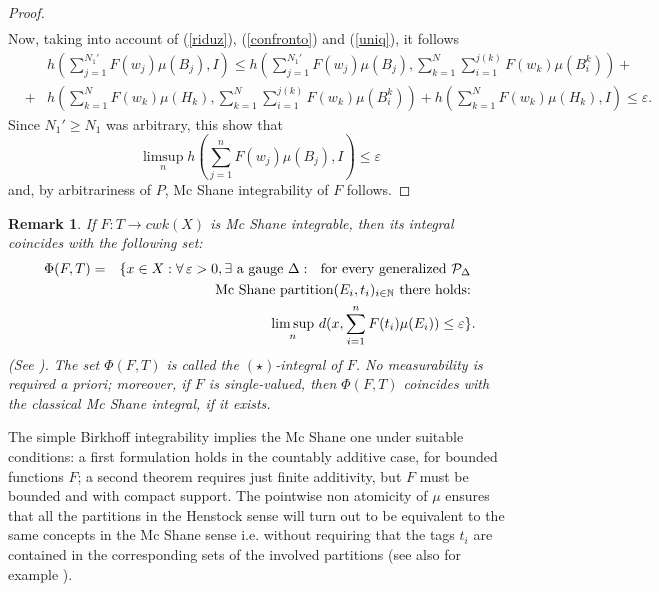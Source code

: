 \documentclass[11pt,a4paper,twoside]{amsart}
\newtheorem{remark}[theorem]{Remark}
\begin{document}
\begin{proof}
\begin{eqnarray}
\end{eqnarray}
Now, taking into account of (\ref{riduz}), (\ref{confronto}) and (\ref{uniq}), it follows
\begin{eqnarray*}
&& h\left(\sum_{j=1}^{N_1'}F(w_j)\mu(B_j),I\right)\leq 
h\left(\sum_{j=1}^{N_1'}F(w_j)\mu(B_j),\sum_{k=1}^N\sum_{i=1}^{j(k)}F(w_k)\mu(B_i^k)\right)+\\
&+&
h\left(\sum_{k=1}^NF(w_k)\mu(H_k),\sum_{k=1}^N\sum_{i=1}^{j(k)}F(w_k)\mu(B_i^k)\right)+
h\left(\sum_{k=1}^{N}F(w_k)\mu(H_k),I\right)\leq {\varepsilon}.
\end{eqnarray*}
Since $N_1'\geq N_1$ was arbitrary, this show that
$$\limsup_nh\left(\sum_{j=1}^nF(w_j)\mu(B_j),I\right)\leq {\varepsilon}$$
and, by arbitrariness of $P$, Mc Shane integrability of $F$ follows.
\end{proof}
\begin{remark} \rm \label{nota1}
If $F: T \rightarrow cwk(X)$ is Mc Shane integrable, then its integral coincides with
the following set:
\begin{eqnarray*}\label{int*}
\Phi(F,T) &=& \{ x \in X: \forall \, \varepsilon > 0, \exists \mbox{~a gauge~} \Delta :
\mbox{~~for every generalized {\mbox{$\mathcal{P}_{\Delta}$}~}} \\ & &
 \mbox{ Mc Shane partition}
(E_i,t_i)_{i\in \mathbb{N}} \mbox{~there holds:~}
\\ & &  \limsup_n \, d(x, \sum_{i=1}^{n} F(t_i) \mu(E_i)) \leq \varepsilon \}.
\end{eqnarray*}
(See \cite[Proposition 1]{bs2004}). The set $\Phi(F,T)$ is called the
 $(\star)$-integral of $F$.
No measurability is required a priori;
 moreover, if $F$ is single-valued, then $\Phi(F, T)$ coincides with the classical Mc Shane integral, if it exists.
\end{remark}

The simple Birkhoff integrability implies the Mc Shane one under suitable conditions: a first formulation holds in the countably additive case, for bounded functions $F$; a second theorem requires just finite additivity, but $F$ must be bounded and with compact support.
The pointwise non atomicity of  $\mu$ ensures that 
 all the partitions in the Henstock sense will turn out to be equivalent to the same concepts in the Mc Shane sense
i.e. without requiring that the  tags  $t_i$ are contained in the corresponding sets of the involved partitions
 (see also for example \cite[Proposition 2.3]{bcs2014}).
\end{document}
